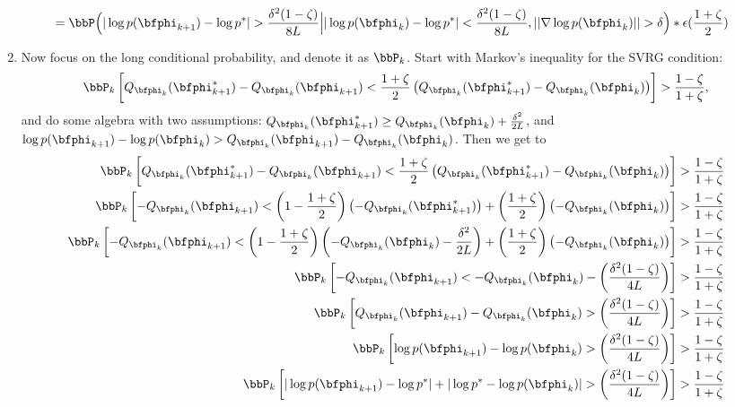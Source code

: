 \begin{enumerate}
\begin{align*}
        & = \bbP\Big(|\log p(\bfphi_{k+1}) - \log p^*| > \frac{\delta^2(1-\zeta)}{8L} \Big| |\log p(\bfphi_k) - \log p^*| < \frac{\delta^2(1-\zeta)}{8L}, ||\nabla \log p(\bfphi_k)|| > \delta \Big) * \epsilon(\frac{1+\zeta}{2})
    \end{align*}
    \item Now focus on the long conditional probability, and denote it as $\bbP_k$. Start with Markov's inequality for the SVRG condition:
    $$\bbP_k\left[Q_{\bfphi_k}(\bfphi^*_{k+1}) - Q_{\bfphi_k}(\bfphi_{k+1}) < \frac{1+\zeta}{2}\left(Q_{\bfphi_k}(\bfphi^*_{k+1}) - Q_{\bfphi_k}(\bfphi_{k})\right)\right] > \frac{1-\zeta}{1+\zeta},$$
    and do some algebra with two assumptions: $Q_{\bfphi_k}(\bfphi^*_{k+1}) \geq Q_{\bfphi_k}(\bfphi_k) + \frac{\delta^2}{2L}$, and $\log p(\bfphi_{k+1}) - \log p(\bfphi_{k}) > Q_{\bfphi_k}(\bfphi_{k+1}) - Q_{\bfphi_k}(\bfphi_{k})$. Then we get to
    \begin{align*}
        \bbP_k\left[Q_{\bfphi_k}(\bfphi^*_{k+1}) - Q_{\bfphi_k}(\bfphi_{k+1}) < \frac{1+\zeta}{2}\left(Q_{\bfphi_k}(\bfphi^*_{k+1}) - Q_{\bfphi_k}(\bfphi_{k})\right)\right] &> \frac{1-\zeta}{1+\zeta} \\
        \bbP_k\left[- Q_{\bfphi_k}(\bfphi_{k+1}) < \left(1-\frac{1+\zeta}{2}\right)\left(-Q_{\bfphi_k}(\bfphi^*_{k+1})\right) + \left(\frac{1+\zeta}{2}\right) \left(-Q_{\bfphi_{k}}(\bfphi_{k})\right)\right] &> \frac{1-\zeta}{1+\zeta} \\
        \bbP_k\left[-Q_{\bfphi_k}(\bfphi_{k+1}) < \left(1-\frac{1+\zeta}{2}\right)\left(-Q_{\bfphi_k}(\bfphi_{k}) - \frac{\delta^2}{2L}\right) + \left(\frac{1+\zeta}{2}\right) \left(-Q_{\bfphi_{k}}(\bfphi_{k})\right) \right] &> \frac{1-\zeta}{1+\zeta} \\
        \bbP_k\left[-Q_{\bfphi_k}(\bfphi_{k+1}) < -Q_{\bfphi_k}(\bfphi_{k}) - \left(\frac{\delta^2(1-\zeta)}{4L}\right) \right] &> \frac{1-\zeta}{1+\zeta} \\
        \bbP_k\left[Q_{\bfphi_k}(\bfphi_{k+1}) - Q_{\bfphi_k}(\bfphi_{k}) >  \left(\frac{\delta^2(1-\zeta)}{4L}\right) \right] &> \frac{1-\zeta}{1+\zeta} \\
        \bbP_k\left[\log p(\bfphi_{k+1}) - \log p(\bfphi_{k}) >  \left(\frac{\delta^2(1-\zeta)}{4L}\right) \right] &> \frac{1-\zeta}{1+\zeta} \\
        \bbP_k\left[|\log p(\bfphi_{k+1}) -\log p^*| + |\log p^* - \log p(\bfphi_{k})| >  \left(\frac{\delta^2(1-\zeta)}{4L}\right) \right] &> \frac{1-\zeta}{1+\zeta} \\

\end{align*}
\end{enumerate}
